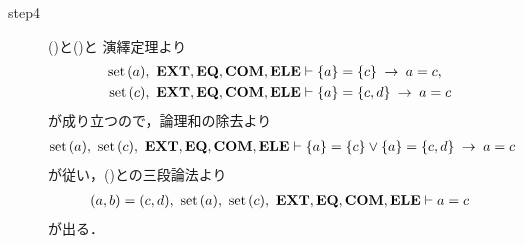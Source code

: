 \begin{sketch}
\begin{description}
			\item[step4] ()と()と
				演繹定理より
				\begin{align}
					\set{a},\ \EXTAX,\EQAX,\COMAX,\ELEAX &\vdash \{a\} = \{c\} \rarrow a = c, \\
					\set{c},\ \EXTAX,\EQAX,\COMAX,\ELEAX &\vdash \{a\} = \{c,d\} \rarrow a = c
				\end{align}
				が成り立つので，論理和の除去より
				\begin{align}
					\set{a},\ \set{c},\ \EXTAX,\EQAX,\COMAX,\ELEAX \vdash 
					\{a\} = \{c\} \vee \{a\} = \{c,d\} \rarrow a = c
				\end{align}
				が従い，()との三段論法より
				\begin{align}
					(a,b) = (c,d),\ \set{a},\ \set{c},\ \EXTAX,\EQAX,\COMAX,\ELEAX \vdash a = c
					\label{fom:equality_of_ordered_pairs_5}
				\end{align}
				が出る．
				

\end{description}
\end{sketch}
